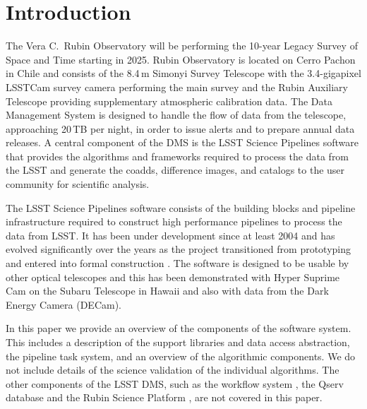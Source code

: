 \section{Introduction}
\label{sec:intro}

The Vera C.\ Rubin Observatory will be performing the 10-year Legacy Survey of Space and Time \citep[LSST;][]{2019ApJ...873..111I} starting in 2025.
Rubin Observatory is located on Cerro Pachon in Chile and consists of the 8.4\,m Simonyi Survey Telescope with the 3.4-gigapixel LSSTCam survey camera performing the main survey and the Rubin Auxiliary Telescope providing supplementary atmospheric calibration data.
The Data Management System \citep[DMS;][]{2022arXiv221113611O} is designed to handle the flow of data from the telescope, approaching 20\,TB per night, in order to issue alerts and to prepare annual data releases.
A central component of the DMS is the LSST Science Pipelines software that provides the algorithms and frameworks required to process the data from the LSST and generate the coadds, difference images, and catalogs to the user community for scientific analysis.

The LSST Science Pipelines software consists of the building blocks and pipeline infrastructure required to construct high performance pipelines to process the data from LSST.
It has been under development since at least 2004 \citep{2004AAS...20510811A} and has evolved significantly over the years as the project transitioned from prototyping \citep{2010SPIE.7740E..15A} and entered into formal construction \citep{2017ASPC..512..279J}.
The software is designed to be usable by other optical telescopes and this has been demonstrated with Hyper Suprime Cam on the Subaru Telescope in Hawaii \citep{2018PASJ...70S...5B} and also with data from the Dark Energy Camera (DECam).

In this paper we provide an overview of the components of the software system.
This includes a description of the support libraries and data access abstraction, the pipeline task system, and an overview of the algorithmic components.
We do not include details of the science validation of the individual algorithms.
The other components of the LSST DMS, such as the workflow system \citep{2022arXiv221115795G}, the Qserv database \citep{Wang:2011:QDS:2063348.2063364} and the Rubin Science Platform \citep{LSE-319}, are not covered in this paper.
